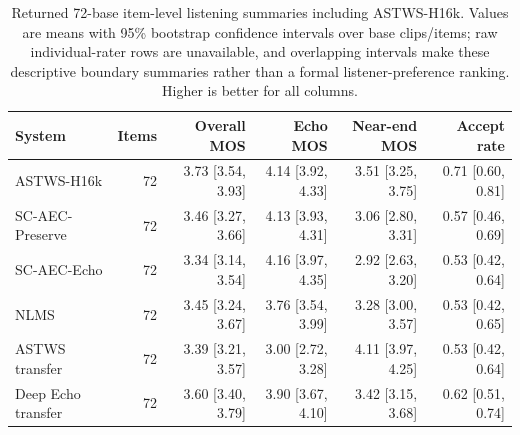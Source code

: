 \begin{table}[t]
\caption{Returned 72-base item-level listening summaries including ASTWS-H16k. Values are means with 95\% bootstrap confidence intervals over base clips/items; raw individual-rater rows are unavailable, and overlapping intervals make these descriptive boundary summaries rather than a formal listener-preference ranking. Higher is better for all columns.}
\label{tab:returned-human}
\centering
\footnotesize
\begin{tabular}{lrrrrr}
\hline
System & Items & Overall MOS & Echo MOS & Near-end MOS & Accept rate \\
\hline
ASTWS-H16k & 72 & 3.73 [3.54, 3.93] & 4.14 [3.92, 4.33] & 3.51 [3.25, 3.75] & 0.71 [0.60, 0.81] \\
SC-AEC-Preserve & 72 & 3.46 [3.27, 3.66] & 4.13 [3.93, 4.31] & 3.06 [2.80, 3.31] & 0.57 [0.46, 0.69] \\
SC-AEC-Echo & 72 & 3.34 [3.14, 3.54] & 4.16 [3.97, 4.35] & 2.92 [2.63, 3.20] & 0.53 [0.42, 0.64] \\
NLMS & 72 & 3.45 [3.24, 3.67] & 3.76 [3.54, 3.99] & 3.28 [3.00, 3.57] & 0.53 [0.42, 0.65] \\
ASTWS transfer & 72 & 3.39 [3.21, 3.57] & 3.00 [2.72, 3.28] & 4.11 [3.97, 4.25] & 0.53 [0.42, 0.64] \\
Deep Echo transfer & 72 & 3.60 [3.40, 3.79] & 3.90 [3.67, 4.10] & 3.42 [3.15, 3.68] & 0.62 [0.51, 0.74] \\
\hline
\end{tabular}
\end{table}
